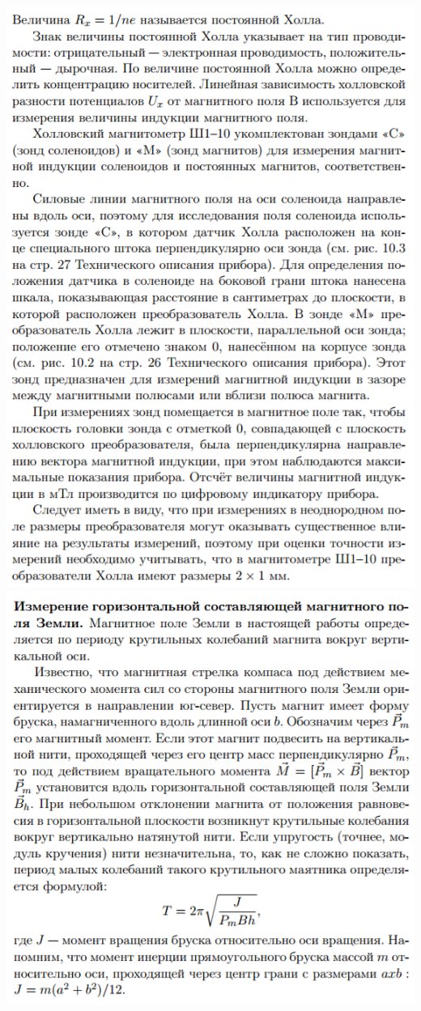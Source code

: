 \documentclass[12pt]{article}
\begin{document}
\begin{center}
	    \includegraphics[width=15cm]{theory14.png}
	    \includegraphics[width=15cm]{theory15.png}
    \end{center}
    
\end{document}
